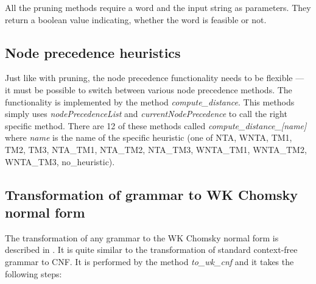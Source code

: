 All the pruning methods require a word and the input string as parameters. They return a boolean value indicating, whether the word is feasible or not.

\subsection{Node precedence heuristics}
Just like with pruning, the node precedence functionality needs to be flexible --- it must be possible to switch between various node precedence methods. The functionality is implemented by the method \textit{compute\_distance}. This methods simply uses \textit{nodePrecedenceList} and \textit{currentNodePrecedence} to call the right specific method.
There are 12 of these methods called \textit{compute\_distance\_[name]} where \textit{name} is the name of the specific heuristic (one of NTA, WNTA, TM1, TM2, TM3, NTA\_TM1, NTA\_TM2, NTA\_TM3, WNTA\_TM1, WNTA\_TM2, WNTA\_TM3, no\_heuristic).

\subsection{Transformation of grammar to WK Chomsky normal form}
The transformation of any grammar to the WK Chomsky normal form is described in \cite{WK_CYK}. It is quite similar to the transformation of standard context-free grammar to CNF. It is performed by the method \textit{to\_wk\_cnf} and it takes the following steps:

